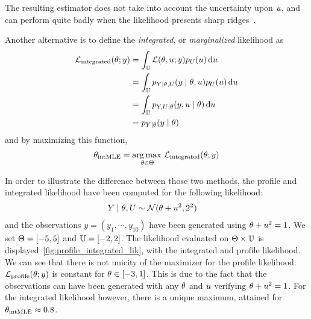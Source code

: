 \documentclass[../../Main_ManuscritThese.tex]{subfiles}
\begin{document}
The resulting estimator does not take into account the uncertainty upon $u$, and can perform quite badly when the likelihood presents sharp ridges~\cite{berger_integrated_1999}.

Another alternative is to define the \emph{integrated}, or \emph{marginalized} likelihood as
\begin{align}
  \mathcal{L}_{\mathrm{integrated}}(\theta;y) &= \int_{\mathbb{U}} \mathcal{L}(\theta,u;y) p_{U}(u) \,\mathrm{d}u \label{eq:def_int_lik}\\
                                              &=\int_{\mathbb{U}} p_{Y|\theta,U}(y \mid \theta,u) p_{U}(u) \,\mathrm{d}u \\
                                              &=\int_{\mathbb{U}} p_{Y,U|\theta}(y,u \mid \theta)\,\mathrm{d}u \\
  &= p_{Y \mid \theta}(y \mid \theta)
\end{align}
and by maximizing this function,
\begin{equation}
  {\theta}_{\mathrm{intMLE}} = \operatorname*{arg\,max \,}_{\theta\in\Theta}   \mathcal{L}_{\mathrm{integrated}}(\theta;y)
\end{equation}


\begin{example}
  \label{ex:profile_int_lik}
In order to illustrate the difference between those two methods, the profile and integrated likelihood have been computed for the following likelihood:
\begin{align}
  Y \mid \theta, U &\sim \mathcal{N}(\theta + u^2, 2^2)
\end{align}
and the observations $y = (y_1,\cdots, y_{10})$ have been generated
using $\theta+u^2=1$. We set $\Kspace = \interval{-5}{5}$ and
$\Uspace = \interval{-2}{2}$. The likelihood evaluated on
$\Theta \times \mathbb{U}$ is
displayed~\cref{fig:profile_integrated_lik}, with the integrated and
profile likelihood.  We can see that there is not unicity of the
maximizer for the profile likelihood:
$\mathcal{L}_{\mathrm{profile}}(\theta;y)$ is constant for
$\kk \in \interval{-3}{1}$. This is due to the fact that the observations can
have been generated with any $\theta$ and $u$ verifying
$\theta + u^2=1$.  For the integrated likelihood however, there is a
unique maximum, attained for ${\theta}_{\mathrm{intMLE}} \approx 0.8$.
\end{example}

\end{document}
